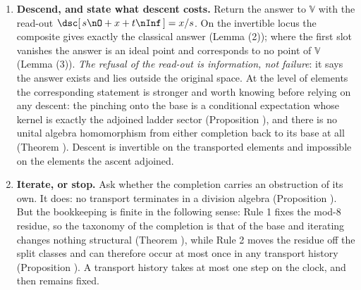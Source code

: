 \begin{enumerate}
\item[\textbf{Step 5.}] \textbf{Descend, and state what descent costs.} Return the answer to $\mathbb{V}$ with the read-out $\dsc[\,s\nO + x + t\nInf\,] = x/s$. On the invertible locus the composite gives exactly the classical answer (Lemma (2)); where the first slot vanishes the answer is an ideal point and corresponds to no point of $\mathbb{V}$ (Lemma (3)). \emph{The refusal of the read-out is information, not failure}: it says the answer exists and lies outside the original space. At the level of elements the corresponding statement is stronger and worth knowing before relying on any descent: the pinching onto the base is a conditional expectation whose kernel is exactly the adjoined ladder sector (Proposition ), and there is no unital algebra homomorphism from either completion back to its base at all (Theorem ). Descent is invertible on the transported elements and impossible on the elements the ascent adjoined.

\item[\textbf{Step 6.}] \textbf{Iterate, or stop.} Ask whether the completion carries an obstruction of its own. It does: no transport terminates in a division algebra (Proposition ). But the bookkeeping is finite in the following sense: Rule 1 fixes the mod-8 residue, so the taxonomy of the completion is that of the base and iterating changes nothing structural (Theorem ), while Rule 2 moves the residue off the split classes and can therefore occur at most once in any transport history (Proposition ). A transport history takes at most one step on the clock, and then remains fixed.
\end{enumerate}
